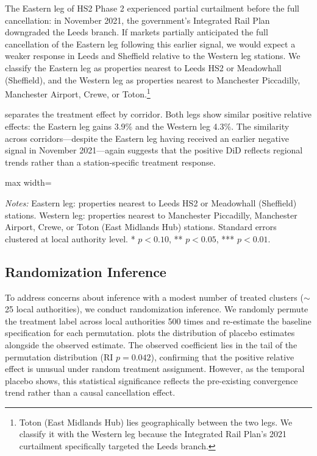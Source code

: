 \documentclass[12pt]{article}
\begin{document}
The Eastern leg of HS2 Phase 2 experienced partial curtailment before the full cancellation: in November 2021, the government's Integrated Rail Plan downgraded the Leeds branch. If markets partially anticipated the full cancellation of the Eastern leg following this earlier signal, we would expect a weaker response in Leeds and Sheffield relative to the Western leg stations. We classify the Eastern leg as properties nearest to Leeds HS2 or Meadowhall (Sheffield), and the Western leg as properties nearest to Manchester Piccadilly, Manchester Airport, Crewe, or Toton.\footnote{Toton (East Midlands Hub) lies geographically between the two legs. We classify it with the Western leg because the Integrated Rail Plan's 2021 curtailment specifically targeted the Leeds branch.}

 separates the treatment effect by corridor. Both legs show similar positive relative effects: the Eastern leg gains 3.9\% and the Western leg 4.3\%. The similarity across corridors---despite the Eastern leg having received an earlier negative signal in November 2021---again suggests that the positive DiD reflects regional trends rather than a station-specific treatment response.

\begin{table}[H]
\centering
\caption{Eastern vs.\ Western Leg Treatment Effects}
\begin{threeparttable}
\begin{adjustbox}{max width=\textwidth}

\end{adjustbox}
\begin{tablenotes}[flushleft]
\small
\item \textit{Notes:} Eastern leg: properties nearest to Leeds HS2 or Meadowhall (Sheffield) stations. Western leg: properties nearest to Manchester Piccadilly, Manchester Airport, Crewe, or Toton (East Midlands Hub) stations. Standard errors clustered at local authority level. * $p<0.10$, ** $p<0.05$, *** $p<0.01$.
\end{tablenotes}
\end{threeparttable}
\label{tab:eastwest}
\end{table}

\subsection{Randomization Inference}\label{sec:ri}

To address concerns about inference with a modest number of treated clusters ($\sim$25 local authorities), we conduct randomization inference. We randomly permute the treatment label across local authorities 500 times and re-estimate the baseline specification for each permutation.  plots the distribution of placebo estimates alongside the observed estimate. The observed coefficient lies in the tail of the permutation distribution (RI $p = 0.042$), confirming that the positive relative effect is unusual under random treatment assignment. However, as the temporal placebo shows, this statistical significance reflects the pre-existing convergence trend rather than a causal cancellation effect.
\end{document}
